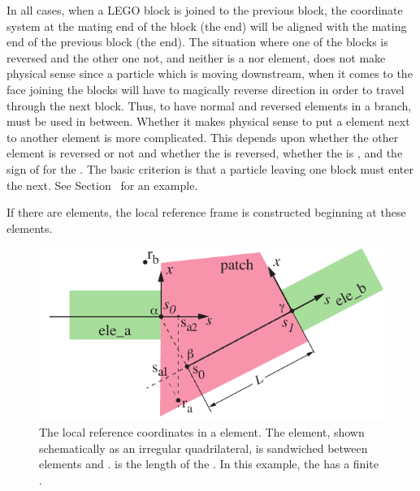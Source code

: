 In all cases, when a LEGO block is joined to the previous block, the
coordinate system at the mating end of the block (the 
end) will be aligned with the mating end of the previous block (the
 end). The situation where one of the blocks is
reversed and the other one not, and neither is a  nor
 element, does not make physical sense since a
particle which is moving downstream, when it comes to the face joining
the blocks will have to magically reverse direction in order to travel
through the next block. Thus, to have normal and reversed elements in
a branch,   must be used in between.
Whether it makes physical sense to put a  element next to
another element is more complicated. This depends upon whether the
other element is reversed or not and whether the  is
reversed, whether the  is , and the sign of
 for the . The basic criterion is that a
particle leaving one block must enter the next. See
Section~ for an example.

If there are  elements, the local reference frame is
constructed beginning at these elements.


\begin{figure}[tb]
  \centering
  \includegraphics[width=5in]{patch-problem.pdf}
  \caption[The local reference coordinates in a  element.]
{The local reference coordinates in a  element. The
 element, shown schematically as an irregular quadrilateral,
is sandwiched between elements  and .  is
the length of the . In this example, the  has a
finite .}
  \label{f:patch.prob}
\end{figure}

